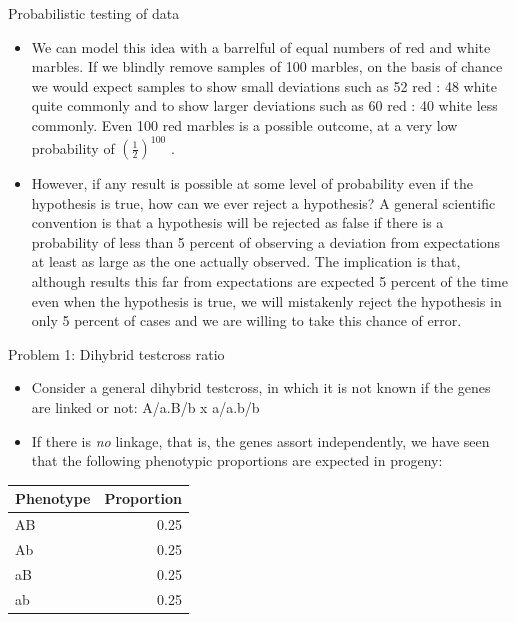 \documentclass[11pt,ignorenonframetext,aspectratio=169]{beamer}
\providecommand{\tightlist}{%
  \setlength{\itemsep}{0pt}\setlength{\parskip}{0pt}}
\begin{document}
\begin{frame}{Probabilistic testing of data}
\protect\hypertarget{probabilistic-testing-of-data}{}
\begin{itemize}
\tightlist
\item
  We can model this idea with a barrelful of equal numbers of red and
  white marbles. If we blindly remove samples of 100 marbles, on the
  basis of chance we would expect samples to show small deviations such
  as 52 red : 48 white quite commonly and to show larger deviations such
  as 60 red : 40 white less commonly. Even 100 red marbles is a possible
  outcome, at a very low probability of
  \(\left(\frac{1}{2}\right)^{100}\) .
\item
  However, if any result is possible at some level of probability even
  if the hypothesis is true, how can we ever reject a hypothesis? A
  general scientific convention is that a hypothesis will be rejected as
  false if there is a probability of less than 5 percent of observing a
  deviation from expectations at least as large as the one actually
  observed. The implication is that, although results this far from
  expectations are expected 5 percent of the time even when the
  hypothesis is true, we will mistakenly reject the hypothesis in only 5
  percent of cases and we are willing to take this chance of error.
\end{itemize}
\end{frame}

\begin{frame}{Problem 1: Dihybrid testcross ratio}
\protect\hypertarget{problem-1-dihybrid-testcross-ratio}{}
\small

\begin{itemize}
\tightlist
\item
  Consider a general dihybrid testcross, in which it is not known if the
  genes are linked or not: A/a.B/b x a/a.b/b
\item
  If there is \emph{no} linkage, that is, the genes assort
  independently, we have seen that the following phenotypic proportions
  are expected in progeny:
\end{itemize}

\begin{table}
\centering\begingroup\fontsize{6}{8}\selectfont

\begin{tabular}{lr}
\toprule
Phenotype & Proportion\\
\midrule
AB & 0.25\\
Ab & 0.25\\
aB & 0.25\\
ab & 0.25\\
\bottomrule
\end{tabular}
\endgroup{}
\end{table}
\end{frame}
\end{document}
